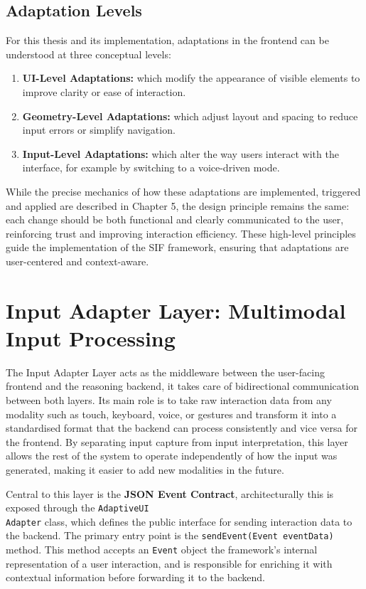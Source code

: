\documentclass[openany]{book}
\begin{document}
\subsection{Adaptation Levels}
For this thesis and its implementation, adaptations in the frontend can be understood at three conceptual levels:
\begin{enumerate}
    \item \textbf{UI-Level Adaptations:} which modify the appearance of visible elements to improve clarity or ease of interaction.
    \item \textbf{Geometry-Level Adaptations:} which adjust layout and spacing to reduce input errors or simplify navigation.
    \item \textbf{Input-Level Adaptations:} which alter the way users interact with the interface, for example by switching to a voice-driven mode.
\end{enumerate}
While the precise mechanics of how these adaptations are implemented, triggered and applied are described in Chapter 5, the design principle remains the same: each change should be both functional and clearly communicated to the user, reinforcing trust and improving interaction efficiency. These high-level principles guide the implementation of the SIF framework, ensuring that adaptations are user-centered and context-aware.

\section{Input Adapter Layer: Multimodal Input Processing}
The Input Adapter Layer acts as the middleware between the user-facing frontend and the reasoning backend, it takes care of bidirectional communication between both layers. Its main role is to take raw interaction data from any modality such as touch, keyboard, voice, or gestures and transform it into a standardised format that the backend can process consistently and vice versa for the frontend. By separating input capture from input interpretation, this layer allows the rest of the system to operate independently of how the input was generated, making it easier to add new modalities in the future.

Central to this layer is the \textbf{JSON Event Contract}, architecturally this is exposed through the \texttt{AdaptiveUI\\Adapter} class, which defines the public interface for sending interaction data to the backend. The primary entry point is the \texttt{sendEvent(Event eventData)} method. This method accepts an \texttt{Event} object the framework’s internal representation of a user interaction, and is responsible for enriching it with contextual information before forwarding it to the backend.
\end{document}
